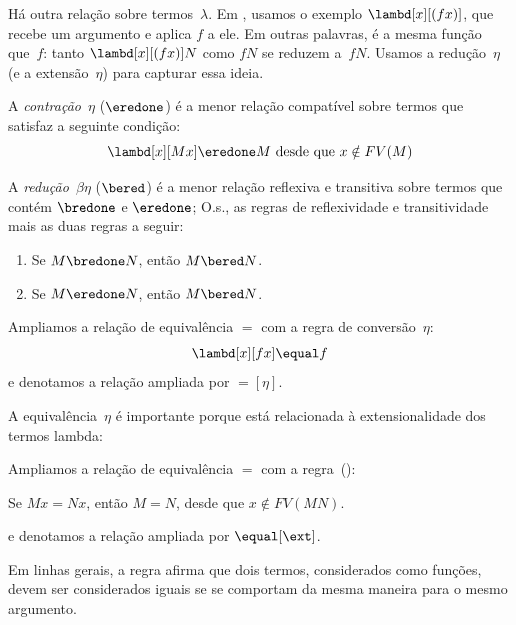 \documentclass[../../../include/open-logic-section]{subfiles}
\begin{document}

Há outra relação sobre termos~$\lambda$. Em , usamos o exemplo
$\lambd[x][(fx)]$, que recebe um argumento e aplica $f$ a ele. Em outras
palavras, é a mesma função que~$f$: tanto $\lambd[x][(fx)]N$ como $fN$ se
reduzem a~$fN$. Usamos a redução~$\eta$ (e a extensão~$\eta$) para capturar
essa ideia.

\begin{defn}
  A \emph{contração~$\eta$} ($\eredone$) é a menor relação compatível sobre
  termos que satisfaz a seguinte condição:
  \[
    \lambd[x][M x] \eredone M \text{ desde que } x \notin FV(M)
  \]
\end{defn}

\begin{defn} 
  A \emph{redução~$\beta\eta$} ($\bered$) é a menor relação reflexiva e
  transitiva sobre termos que contém $\bredone$ e $\eredone$; O.s.\@, as
  regras de reflexividade e transitividade mais as duas regras a seguir:
  \begin{enumerate}
  \item Se $M \bredone N$, então $M \bered N$. 
  \item Se $M \eredone N$, então $M \bered N$. 
  \end{enumerate}
    
\end{defn}

\begin{defn}
  Ampliamos a relação de equivalência $\equal$ com a regra de conversão~$\eta$:
  \[
  \lambd[x][f x] \equal f
  \]
  e denotamos a relação ampliada por $\equal[\eta]$.
\end{defn}

A equivalência~$\eta$ é importante porque está relacionada à extensionalidade
dos termos lambda:

\begin{defn}[Extensionalidade]
  Ampliamos a relação de equivalência $\equal$ com a regra~(\ext):
  \begin{center}
  Se $Mx \equal Nx$, então $M \equal N$, desde que $x \notin FV(MN)$.
  \end{center}
  e denotamos a relação ampliada por $\equal[\ext]$.
\end{defn}

Em linhas gerais, a regra afirma que dois termos, considerados como funções,
devem ser considerados iguais se se comportam da mesma maneira para o mesmo
argumento.
\end{document}
